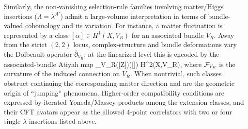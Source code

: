 \documentclass[12pt]{article}
\begin{document}
		Similarly, the non-vanishing selection-rule families involving matter/Higgs insertions ($\Lambda=\lambda^{A'}$) admit a large-volume interpretation in terms of bundle-valued cohomology and its variation. For instance, a matter fluctuation is represented by a class $[\alpha]\in H^{1}(X,V_R)$ for an associated bundle $V_R$. Away from the strict $(2,2)$ locus, complex-structure and bundle deformations vary the Dolbeault operator $\bar\partial_{V_R}$; at the linearized level this is encoded by the associated-bundle Atiyah map
	\ie
	\alpha_{V_R}([Z])([\alpha]) \;\equiv{}\;\in\; H^{2}(X,V_R),
	\fe
	where ${\cal F}_{V_R}$ is the curvature of the induced connection on $V_R$. When nontrivial, such classes obstruct continuing the corresponding matter direction and are the geometric origin of ``jumping'' phenomena. Higher-order compatibility conditions are expressed by iterated Yoneda/Massey products among the extension classes, and their CFT avatars appear as the allowed 4-point correlators with two or four single-$\lambda$ insertions listed above.
	
	
	
	
\end{document}

